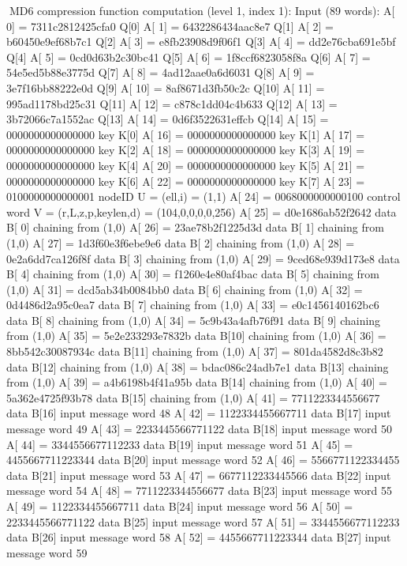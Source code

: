 MD6 compression function computation (level 1, index 1):
Input (89 words):
A[   0] = 7311c2812425cfa0 Q[0]
A[   1] = 6432286434aac8e7 Q[1]
A[   2] = b60450e9ef68b7c1 Q[2]
A[   3] = e8fb23908d9f06f1 Q[3]
A[   4] = dd2e76cba691e5bf Q[4]
A[   5] = 0cd0d63b2c30bc41 Q[5]
A[   6] = 1f8ccf6823058f8a Q[6]
A[   7] = 54e5ed5b88e3775d Q[7]
A[   8] = 4ad12aae0a6d6031 Q[8]
A[   9] = 3e7f16bb88222e0d Q[9]
A[  10] = 8af8671d3fb50c2c Q[10]
A[  11] = 995ad1178bd25c31 Q[11]
A[  12] = c878c1dd04c4b633 Q[12]
A[  13] = 3b72066c7a1552ac Q[13]
A[  14] = 0d6f3522631effcb Q[14]
A[  15] = 0000000000000000 key K[0]
A[  16] = 0000000000000000 key K[1]
A[  17] = 0000000000000000 key K[2]
A[  18] = 0000000000000000 key K[3]
A[  19] = 0000000000000000 key K[4]
A[  20] = 0000000000000000 key K[5]
A[  21] = 0000000000000000 key K[6]
A[  22] = 0000000000000000 key K[7]
A[  23] = 0100000000000001 nodeID U = (ell,i) = (1,1)
A[  24] = 0068000000000100 control word V = (r,L,z,p,keylen,d) = (104,0,0,0,0,256)
A[  25] = d0e1686ab52f2642 data B[ 0] chaining from (1,0)
A[  26] = 23ae78b2f1225d3d data B[ 1] chaining from (1,0)
A[  27] = 1d3f60e3f6ebe9e6 data B[ 2] chaining from (1,0)
A[  28] = 0e2a6dd7ca126f8f data B[ 3] chaining from (1,0)
A[  29] = 9ced68e939d173e8 data B[ 4] chaining from (1,0)
A[  30] = f1260e4e80af4bac data B[ 5] chaining from (1,0)
A[  31] = dcd5ab34b0084bb0 data B[ 6] chaining from (1,0)
A[  32] = 0d4486d2a95c0ea7 data B[ 7] chaining from (1,0)
A[  33] = e0c1456140162bc6 data B[ 8] chaining from (1,0)
A[  34] = 5c9b43a4afb76f91 data B[ 9] chaining from (1,0)
A[  35] = 5e2e233293e7832b data B[10] chaining from (1,0)
A[  36] = 8bb542c30087934c data B[11] chaining from (1,0)
A[  37] = 801da4582d8c3b82 data B[12] chaining from (1,0)
A[  38] = bdac086c24adb7e1 data B[13] chaining from (1,0)
A[  39] = a4b6198b4f41a95b data B[14] chaining from (1,0)
A[  40] = 5a362e4725f93b78 data B[15] chaining from (1,0)
A[  41] = 7711223344556677 data B[16] input message word   48
A[  42] = 1122334455667711 data B[17] input message word   49
A[  43] = 2233445566771122 data B[18] input message word   50
A[  44] = 3344556677112233 data B[19] input message word   51
A[  45] = 4455667711223344 data B[20] input message word   52
A[  46] = 5566771122334455 data B[21] input message word   53
A[  47] = 6677112233445566 data B[22] input message word   54
A[  48] = 7711223344556677 data B[23] input message word   55
A[  49] = 1122334455667711 data B[24] input message word   56
A[  50] = 2233445566771122 data B[25] input message word   57
A[  51] = 3344556677112233 data B[26] input message word   58
A[  52] = 4455667711223344 data B[27] input message word   59
